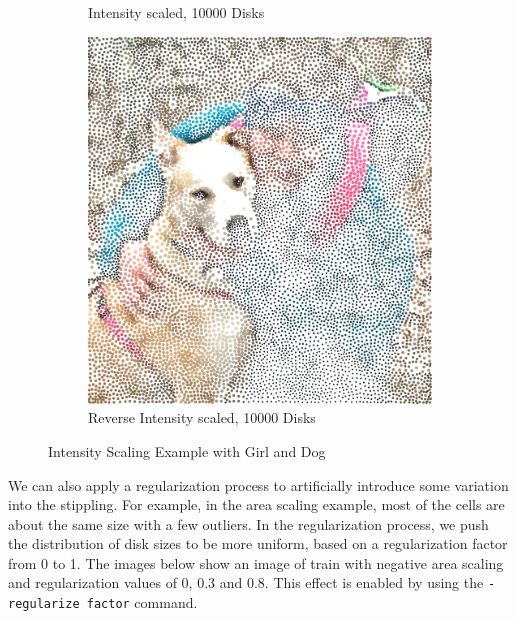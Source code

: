 \documentclass[11pt]{article}
\begin{document}
\begin{figure}[H]
\begin{subfigure}[b]{.48\linewidth}
		\caption{Intensity scaled, 10000 Disks}
		\label{fig:rff2}
	\end{subfigure}
	\begin{subfigure}[b]{.48\linewidth}
		\includegraphics[width=\linewidth]{Emilee-And-Lola-IntensityScaled-10000}
		\caption{Reverse Intensity scaled, 10000 Disks}
		\label{fig:rff3}
	\end{subfigure}
	\caption{Intensity Scaling Example with Girl and Dog}
	\label{fig:rff4}
\end{figure}

We can also apply a regularization process to artificially introduce some variation into the stippling. For example, in the area scaling example, most of the cells are about the same size with a few outliers. In the regularization process, we push the distribution of disk sizes to be more uniform, based on a regularization factor from 0 to 1. The images below show an image of train with negative area scaling and regularization values of 0, 0.3 and 0.8. This effect is enabled by using the \verb|-regularize factor| command. 
\end{document}
